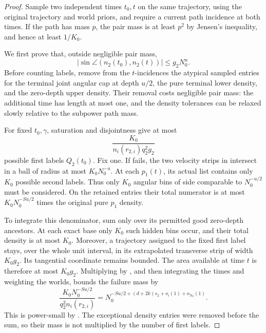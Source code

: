 \begin{proof}
Sample two independent times \(t_0,t\) on the same trajectory, using the
original trajectory and world priors, and require a current path
incidence at both times.  If the path has mass \(p\), the pair mass is
at least \(p^2\) by Jensen's inequality, and hence at least \(1/K_0\).

We first prove that, outside negligible pair mass,
\begin{equation}
 \label{a08:full-time-angle}
 |\sin\angle(n_2(t_0),n_2(t))|\le g_2N_0^u.
\end{equation}
Before counting labels, remove from the \(t\)-incidences the atypical
sampled entries for the terminal joint angular cap at depth \(u/2\),
the pure terminal lower density, and the zero-depth upper density.
Their removal costs negligible pair mass: the additional time has
length at most one, and the density tolerances can be relaxed slowly
relative to the subpower path mass.

For fixed \(t_0,\gamma\), saturation and disjointness give at most
\begin{equation}
 \label{a08:first-label-count}
 \frac{K_0}{n_i(r_{2,i})q_2^2g_2}
\end{equation}
possible first labels \(Q_2(t_0)\).  Fix one.  If
 fails, the two velocity strips in
 intersect in a ball of radius at most
\(K_0N_0^{-u}\).  At each \(p_1(t)\), its actual list contains only
\(K_0\) possible second labels.  Thus only \(K_0\) angular bins of
side comparable to \(N_0^{-u/2}\) must be considered.  On the retained
entries their total numerator is at most
\(K_0N_0^{-Su/2}\) times the original pure \(p_1\) density.

To integrate this denominator, sum only over its permitted good
zero-depth ancestors.  At each exact base only \(K_0\) such hidden
bins occur, and their total density is at most \(K_0\).
Moreover, a trajectory assigned to the fixed first label stays, over
the whole unit interval, in its extrapolated transverse strip of width
\(K_0g_2\).  Its tangential coordinate remains bounded.  The area
available at time \(t\) is therefore at most \(K_0g_2\).
Multiplying by , and then integrating
the times and weighting the worlds, bounds the failure mass by
\begin{equation}
 \label{a08:angle-failure}
 \frac{K_0N_0^{-Su/2}}{q_2^2n_i(r_{2,i})}
 =
 N_0^{-Su/2+(d+2k)s_2+o_i(1)+o_{N_0}(1)}.
\end{equation}
This is power-small by .  The exceptional
density entries were removed before the sum, so their mass is not
multiplied by the number of first labels.


\end{proof}
